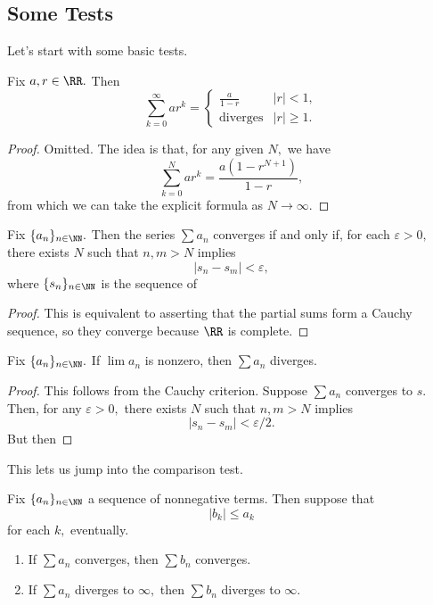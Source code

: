 \subsection{Some Tests}
Let's start with some basic tests.
\begin{proposition}
	Fix $a,r\in\RR.$ Then
	\[\sum_{k=0}^\infty ar^k=\begin{cases}
		\frac a{1-r} & |r|<1, \\
		\text{diverges} & |r|\ge1.
	\end{cases}\]
\end{proposition}
\begin{proof}
	Omitted. The idea is that, for any given $N,$ we have
	\[\sum_{k=0}^Nar^k=\frac{a\left(1-r^{N+1}\right)}{1-r},\]
	from which we can take the explicit formula as $N\to\infty.$
\end{proof}
\begin{proposition}
	Fix $\{a_n\}_{n\in\NN}.$ Then the series $\sum a_n$ converges if and only if, for each $\varepsilon>0,$ there exists $N$ such that $n,m>N$ implies
	\[|s_n-s_m|<\varepsilon,\]
	where $\{s_n\}_{n\in\NN}$ is the sequence of 
\end{proposition}
\begin{proof}
	This is equivalent to asserting that the partial sums form a Cauchy sequence, so they converge because $\RR$ is complete.
\end{proof}
\begin{proposition}
	Fix $\{a_n\}_{n\in\NN}.$ If $\lim a_n$ is nonzero, then $\sum a_n$ diverges.
\end{proposition}
\begin{proof}
	This follows from the Cauchy criterion. Suppose $\sum a_n$ converges to $s.$ Then, for any $\varepsilon>0,$ there exists $N$ such that $n,m>N$ implies
	\[|s_n-s_m|<\varepsilon/2.\]
	But then \todo{}
\end{proof}
This lets us jump into the comparison test.
\begin{prop}
	Fix $\{a_n\}_{n\in\NN}$ a sequence of nonnegative terms. Then suppose that
	\[|b_k|\le a_k\]
	for each $k,$ eventually.
	\begin{enumerate}[label=(\alph*)]
		\item If $\sum a_n$ converges, then $\sum b_n$ converges.
		\item If $\sum a_n$ diverges to $\infty,$ then $\sum b_n$ diverges to $\infty.$
	\end{enumerate}
\end{prop}
